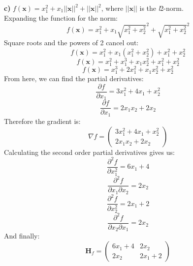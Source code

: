 \documentclass{article}
\begin{document}
\textbf{c)} $f(\boldsymbol{x}) = x_1^2 + x_1||\boldsymbol{x}||^2 + ||\boldsymbol{x}||^2$, where $||\boldsymbol{x}||$ is the \textit{l}2-norm.\\
Expanding the function for the norm:
\begin{equation*}
    f(\boldsymbol{x}) = x_1^2 + x_1 \sqrt{x_1^2 + x_2^2}^2 + \sqrt{x_1^2 + x_2^2}^2
\end{equation*}
Square roots and the powers of 2 cancel out:
\begin{equation*}
    f(\boldsymbol{x}) = x_1^2 + x_1(x_1^2 + x_2^2) + x_1^2 + x_2^2
\end{equation*}
\begin{equation*}
    f(\boldsymbol{x}) = x_1^2 + x_1^3 + x_1x_2^2 + x_1^2 + x_2^2
\end{equation*}
\begin{equation*}
    f(\boldsymbol{x}) = x_1^3 + 2x_1^2 + x_1x_2^2 + x_2^2
\end{equation*}
From here, we can find the partial derivatives:
\begin{equation*}
    \frac{\partial f}{\partial x_1} = 3x_1^2 + 4x_1 + x_2^2
\end{equation*}
\begin{equation*}
    \frac{\partial f}{\partial x_1} = 2x_1x_2 + 2x_2
\end{equation*}
Therefore the gradient is:
\begin{equation*}
    \nabla f = \begin{pmatrix} 3x_1^2 + 4x_1 + x_2^2\\ 2x_1x_2 + 2x_2\end{pmatrix}
\end{equation*}
Calculating the second order partial derivatives gives us:
\begin{equation*}
    \frac{\partial ^2 f}{\partial x_1^2} = 6x_1 + 4
\end{equation*}
\begin{equation*}
    \frac{\partial ^2 f}{\partial x_1 \partial x_2} = 2x_2
\end{equation*}
\begin{equation*}
    \frac{\partial ^2 f}{\partial x_2^2} = 2x_1 + 2
\end{equation*}
\begin{equation*}
    \frac{\partial ^2 f}{\partial x_2 \partial x_1} = 2x_2
\end{equation*}
And finally:
\begin{equation}
\label{1c_hess}
    \textbf{H}_f = \begin{pmatrix} 6x_1 + 4 & 2x_2 \\ 2x_2 & 2x_1 + 2 \end{pmatrix}
\end{equation}
\end{document}
